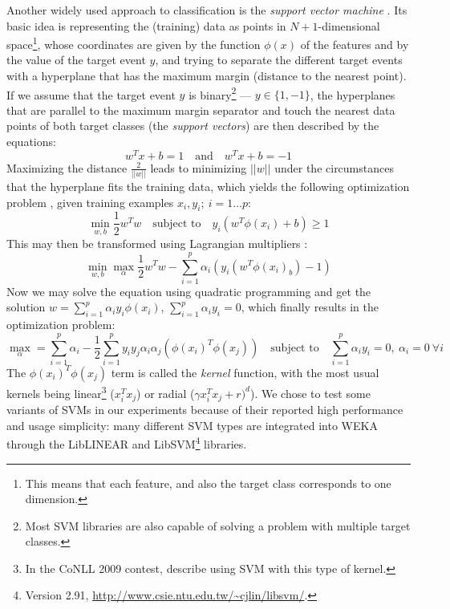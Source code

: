 \documentclass[12pt,notitlepage,a4paper]{report}
\begin{document}
Another widely used approach to classification is the \emph{support vector machine} \citep{boser92}. Its basic idea is representing the (training) data as points in $N+1$-dimensional space\footnote{This means that each feature, and also the target class corresponds to one dimension.}, whose coordinates are given by the function $\phi(x)$ of the features and by the value of the target event $y$, and trying to separate the different target events with a hyperplane that has the maximum margin (distance to the nearest point). If we assume that the target event $y$ is binary\footnote{Most SVM libraries are also capable of solving a problem with multiple target classes.} --- $y\in \{1,-1\}$, the hyperplanes that are parallel to the maximum margin separator and touch the nearest data points of both target classes (the \emph{support vectors}) are then described by the equations:
\begin{equation}
w^T x + b = 1\quad\mbox{and}\quad w^T x + b = -1
\end{equation}
Maximizing the distance $\frac{2}{||w||}$ leads to minimizing $||w||$ under the circumstances that the hyperplane fits the training data, which yields the following optimization problem \citep{hsu03}, given training examples $x_i,y_i;\ i = 1\dots p$:
\begin{equation}\label{eq:svm-primal}
\min_{w,b} \frac{1}{2}w^T w\quad\mbox{subject to}\quad y_i(w^T\phi(x_i) + b)\geq 1
\end{equation}
This may then be transformed using Lagrangian multipliers \citep{cristianini00}:
\begin{equation}
\min_{w,b} \max_{\alpha} \frac{1}{2}w^T w - \sum_{i=1}^p \alpha_i(y_i(w^T\phi(x_i) _ b) - 1)
\end{equation}
Now we may solve the equation using quadratic programming and get the solution $w = \sum_{i=1}^p \alpha_i y_i \phi(x_i)$, $\sum_{i=1}^p \alpha_i y_i = 0$, which finally results in the optimization problem:
\begin{equation}
\max_{\alpha} = \sum_{i=1}^p \alpha_i - \frac{1}{2}\sum_{i=1}^p y_i y_j \alpha_i \alpha_j (\phi(x_i)^T \phi(x_j))\quad\mbox{subject to}\quad \sum_{i=1}^p \alpha_i y_i = 0,\ \alpha_i = 0\ \forall i
\end{equation}
The $\phi(x_i)^T \phi(x_j)$ term is called the \emph{kernel} function, with the most usual kernels being linear\footnote{In the CoNLL 2009 contest, \citet{che09} describe using SVM with this type of kernel.} ($x_i^T x_j$) or radial ($\gamma x_i^T x_j + r)^d$). We chose to test some variants of SVMs in our experiments because of their reported high performance and usage simplicity: many different SVM types are integrated into WEKA through the LibLINEAR and LibSVM\footnote{Version 2.91, \url{http://www.csie.ntu.edu.tw/\~cjlin/libsvm/}.} \citep{chang01} libraries.
\end{document}
